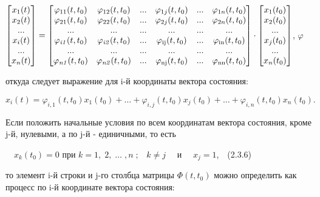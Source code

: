 		
		$\left[\begin{matrix}x_1(t)\\x_2(t)\\...\\x_i(t)\\...\\x_n(t)\end{matrix}\right]=\left[\begin{matrix}\varphi _{11}(t,t_0)&\varphi _{12}(t,t_0)&...&\varphi _{1j}(t,t_0)&...&\varphi _{1n}(t,t_0)\\\varphi _{21}(t,t_0)&\varphi _{22}(t,t_0)&...&\varphi _{2j}(t,t_0)&...&\varphi _{2n}(t,t_0)\\...&...&...&...&...&...\\\varphi _{\mathit{i1}}(t,t_0)&\varphi _{\mathit{i2}}(t,t_0)&...&\varphi _{\normalsubformula{\text{ij}}}(t,t_0)&...&\varphi _{\normalsubformula{\text{in}}}(t,t_0)\\...&...&...&...&...&...\\\varphi _{\mathit{n1}}(t,t_0)&\varphi _{\mathit{n2}}(t,t_0)&...&\varphi _{\text{nj}}(t,t_0)&...&\varphi _{\normalsubformula{\text{nn}}}(t,t_0)\end{matrix}\right]\cdot
		\left[\begin{matrix}x_1(t_0)\\x_2(t_0)\\...\\x_j(t_0)\\...\\x_n(t_0)\end{matrix}\right]$,
$ \varphi $


		откуда следует выражение для i-й координаты вектора состояния:


\begin{equation*}
x_i(t)=\varphi _{i,1}(t,t_0)x_1(t_0)+\ldots +\varphi _{i,j}(t,t_0)x_j(t_0)+\ldots +\varphi _{i,n}(t,t_0)x_n(t_0).
\end{equation*}

\bigskip


		Если положить начальные условия по всем координатам вектора состо­яния, кроме {\textrm{j}}-й, нулевыми, а по
		{\textrm{j}}-й - единичными, то есть



		\ \  $x_k(t_0)=0$ при  $k=1,\;2,\;\ldots \;,n\;;\;\;\;k\neq j$ \ \ и \ \  $x_j=1$,\ \ (2.3.6)



		то элемент {i}-й строки и {j}-го столбца матрицы  $\Phi (t,t_0)$ можно определить как процесс по i-й
		координате вектора состояния:



